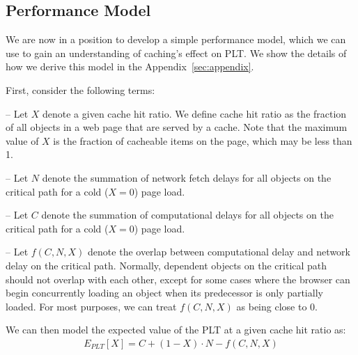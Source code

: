 

\subsection{Performance Model}
\label{subsec:model}

We are now in a position to develop a simple performance model, which we can
use to gain an understanding of caching's effect on PLT. We show the details of how we derive
this model in the Appendix~\ref{sec:appendix}.

First, consider the following terms:

\noindent-- Let $X$ denote a given cache hit ratio. We define cache hit ratio as the fraction
of all objects in a web page that are served by a cache. Note that the maximum
value of $X$ is the fraction of cacheable items on the page, which may be less than 1.

\noindent-- Let $N$ denote the summation of network fetch delays for all objects on the
critical path for a cold ($X=0$) page load.

\noindent-- Let $C$ denote the summation of computational delays for all
objects on the critical path for a cold ($X=0$) page load.

\noindent-- Let $f(C, N, X)$ denote the overlap between computational delay and
network delay on the critical path. Normally, dependent objects on the
critical path should not overlap with each other, except for some cases where the
browser can begin concurrently loading an object
when its predecessor is only partially loaded.
For most purposes, we can treat $f(C, N, X)$
as being close to 0.

We can then model the expected value of the PLT at a given cache hit ratio as:
\begin{align*}
E_{PLT}[X] = C + (1 - X) \cdot N - f(C,N,X)
\end{align*}

